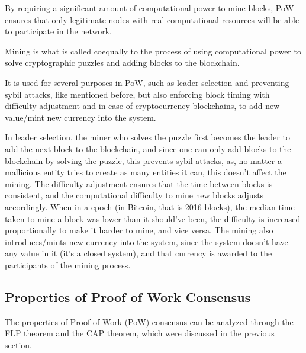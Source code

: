 By requiring a significant amount of computational power to mine blocks, PoW ensures that only legitimate nodes with real computational resources will be able to participate in the network.

Mining is what is called coequally to the process of using computational power to solve cryptographic puzzles and adding blocks to the blockchain.

It is used for several purposes in PoW, such as leader selection and preventing sybil attacks, like mentioned before, but also enforcing block timing with difficulty adjustment and in case of cryptocurrency blockchains, to add new value/mint new currency into the system. 

In leader selection, the miner who solves the puzzle first becomes the leader to add the next block to the blockchain, and since one can only add blocks to the blockchain by solving the puzzle, this prevents sybil attacks, as, no matter a mallicious entity tries to create as many entities it can, this doesn't affect the mining.
The difficulty adjustment ensures that the time between blocks is consistent, and the computational difficulty to mine new blocks adjusts accordingly. When in a epoch (in Bitcoin, that is 2016 blocks), the median time taken to mine a block was lower than it should've been, the difficulty is increased proportionally to make it harder to mine, and vice versa.
The mining also introduces/mints new currency into the system, since the system doesn't have any value in it (it's a closed system), and that currency is awarded to the participants of the mining process.



\subsection*{Properties of Proof of Work Consensus}

The properties of Proof of Work (PoW) consensus can be analyzed through the FLP theorem and the CAP theorem, which were discussed in the previous section.

